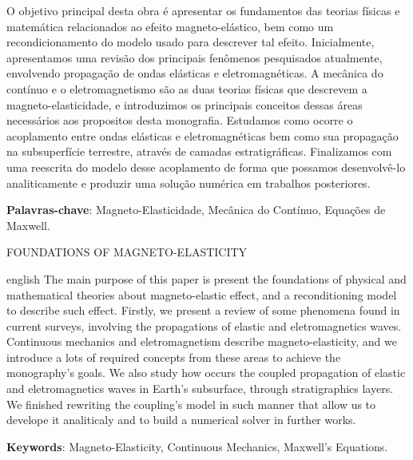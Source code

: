 \documentclass[12pt,a4paper,oneside]{abntex2}
\begin{document}
\begin{resumo}
O objetivo principal desta obra \'e apresentar os fundamentos das teorias f\'isicas e matem\'atica relacionados ao efeito magneto-el\'astico, bem como um recondicionamento do modelo usado para descrever tal efeito. Inicialmente, apresentamos uma revis\~ao dos principais fen\^omenos pesquisados atualmente, envolvendo propaga\c{c}\~ao de ondas el\'asticas e eletromagn\'eticas. A mec\^anica do cont\'inuo e o eletromagnetismo s\~ao as duas teorias f\'isicas que descrevem a magneto-elasticidade, e introduzimos os principais conceitos dessas \'areas necess\'arios aos propositos desta monografia. Estudamos como ocorre o acoplamento entre ondas el\'asticas e eletromagn\'eticas bem como sua propaga\c{c}\~ao na subsuperf\'icie terrestre, atrav\'es de camadas estratigr\'aficas. Finalizamos com uma reescrita do modelo desse acoplamento de forma que possamos desenvolv\^e-lo analiticamente e produzir uma solu\c{c}\~ao num\'erica em trabalhos posteriores.

\vspace{\onelineskip} 
\noindent 
\textbf{Palavras-chave}: Magneto-Elasticidade, Mec\^anica do Cont\'inuo, Equa\c{c}\~oes de Maxwell.
\end{resumo}

\begin{center}
{\ABNTEXchapterfont\Large FOUNDATIONS OF MAGNETO-ELASTICITY}\\\vspace{1cm}
\end{center}

\begin{resumo}[Abstract]
\begin{otherlanguage*}{english}
The main purpose of this paper is present the foundations of physical and mathematical theories about magneto-elastic effect, and a reconditioning model to describe such effect. Firstly, we present a review of some phenomena found in current surveys, involving the propagations of elastic and eletromagnetics waves. Continuous mechanics and eletromagnetism describe magneto-elasticity, and we introduce a lots of required concepts from these areas to achieve the monography's goals. We also study how occurs the coupled propagation of elastic and eletromagnetics waves in Earth's subsurface, through stratigraphics layers. We finished rewriting the coupling's model in such manner that allow us to develope it analiticaly and to build a numerical solver in further works.

\vspace{\onelineskip} 
\noindent 
\textbf{Keywords}: Magneto-Elasticity, Continuous Mechanics, Maxwell's Equations.

\end{otherlanguage*}
\end{resumo}
\end{document}
